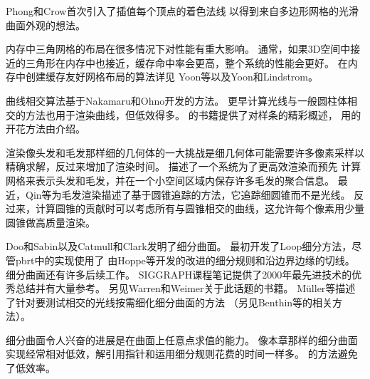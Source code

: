 Phong和Crow\parencite*{phong1975improved}首次引入了插值每个顶点的着色法线
以得到来自多边形网格的光滑曲面外观的想法。

内存中三角网格的布局在很多情况下对性能有重大影响。
通常，如果3D空间中接近的三角形在内存中也接近，缓存命中率会更高，整个系统的性能会更好。
在内存中创建缓存友好网格布局的算法详见
Yoon等\parencite*{10.1145/1186822.1073278}以及Yoon和Lindstrom\parencite*{4015484}。

曲线相交算法基于Nakamaru和Ohno\parencite*{Nakamaru_raytracing}开发的方法。
更早计算光线与一般圆柱体相交的方法也用于渲染曲线，但低效得多\citep{10.1145/6116.6118,DeVoogt2000197}。
\citet{10.5555/501891}的书籍提供了对样条的精彩概述，
用的开花方法由\citet{ramshaw1987blossoming}介绍。

渲染像头发和毛发那样细的几何体的一大挑战是细几何体可能需要许多像素采样以精确求解，反过来增加了渲染时间。
\citet{10.1145/1179849.1179904}描述了一个系统为了更高效渲染而预先
计算网格来表示头发和毛发，并在一个小空间区域内保存许多毛发的聚合信息。
最近，Qin等\parencite*{6684531}为毛发渲染描述了基于圆锥追踪的方法，它追踪细圆锥而不是光线。
反过来，计算圆锥的贡献时可以考虑所有与圆锥相交的曲线，这允许每个像素用少量圆锥做高质量渲染。

Doo和Sabin\parencite*{DOO1978356}以及Catmull和Clark\parencite*{CATMULL1978350}发明了细分曲面。
\citet{loop1987smooth}最初开发了Loop细分方法，尽管pbrt中的实现使用了
由Hoppe等\parencite*{10.1145/192161.192233}开发的改进的细分规则和沿边界边缘的切线。
细分曲面还有许多后续工作。
SIGGRAPH课程笔记提供了2000年最先进技术的优秀总结并有大量参考\citep{zorin2000subdivision}。
另见Warren和Weimer\parencite*{WARREN20021}关于此话题的书籍。
Müller等\parencite*{10.1111/1467-8659.t01-2-00703}描述了针对要测试相交的光线按需细化细分曲面的方法
（另见Benthin等\parencite*{SCI:Ben2007a}的相关方法）。

细分曲面令人兴奋的进展是在曲面上任意点求值的能力\citep{10.1145/280814.280945}。
像本章那样的细分曲面实现经常相对低效，解引用指针和运用细分规则花费的时间一样多。
\citeauthor{10.1145/280814.280945}的方法避免了低效率。